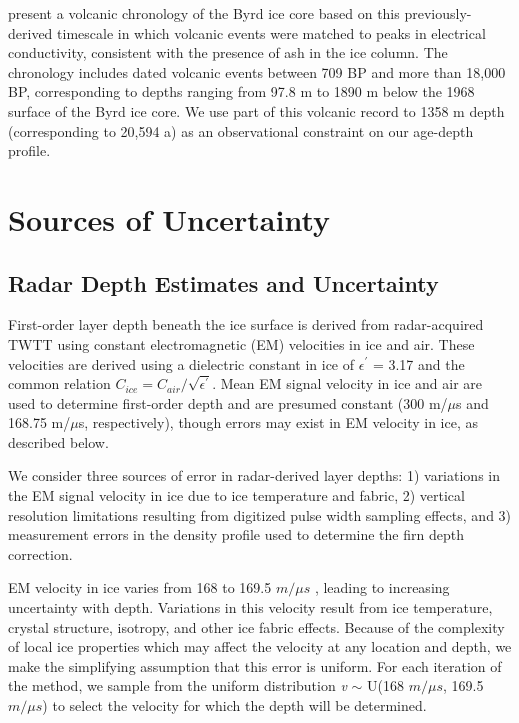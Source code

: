 \documentclass[12pt]{article}
\begin{document}
\citet{hammer1997} present a volcanic chronology of the Byrd ice core based on this previously-derived timescale in which volcanic events were matched to peaks in electrical conductivity, consistent with the presence of ash in the ice column. The chronology includes dated volcanic events between 709 BP and more than 18,000 BP, corresponding to depths ranging from 97.8 m to 1890 m below the 1968 surface of the Byrd ice core. We use part of this volcanic record to 1358 m depth (corresponding to 20,594 a) as an observational constraint on our age-depth profile.



\section{Sources of Uncertainty}\label{unc}

\subsection{Radar Depth Estimates and Uncertainty }\label{radunc}
First-order layer depth beneath the ice surface is derived from radar-acquired TWTT using constant electromagnetic (EM) velocities in ice and air. These velocities are derived using a dielectric constant in ice of $\epsilon$$^{'}$ = 3.17 \citep{peters2005,gudmandsen1971} and the common relation $C_{ice} = C_{air}/\sqrt{\epsilon^{'}}$. Mean EM signal velocity in ice and air are used to determine first-order depth and are presumed constant (300 m/${\mu}$s and 168.75 m/${\mu}$s, respectively), though errors may exist in EM velocity in ice, as described below.  

We consider three sources of error in radar-derived layer depths: 1) variations in the EM signal velocity in ice due to ice temperature and fabric, 2) vertical resolution limitations resulting from digitized pulse width sampling effects, and 3) measurement errors in the density profile used to determine the firn depth correction.

EM velocity in ice varies from 168 to 169.5 $m/{\mu}s$ \citep{fujita2000}, leading to increasing uncertainty with depth. Variations in this velocity result from ice temperature, crystal structure, isotropy, and other ice fabric effects. Because of the complexity of local ice properties which may affect the velocity at any location and depth, we make the simplifying assumption that this error is uniform. For each iteration of the method, we sample from the uniform distribution \textit{v} $\sim$ U(168 $m/{\mu}s$, 169.5 $m/{\mu}s$) to select the velocity for which the depth will be determined. 
\end{document}
